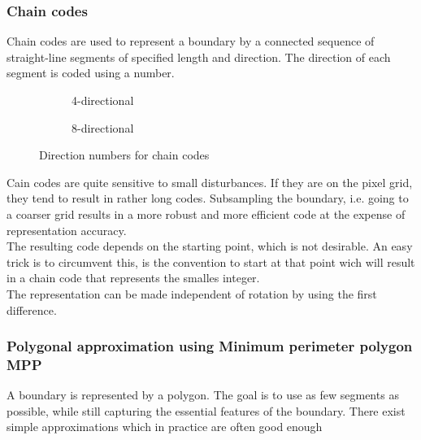 \subsubsection{Chain codes}
Chain codes are used to represent a boundary by a connected sequence of straight-line segments of specified length and direction. The direction of each segment is coded using a number.
\begin{figure}[h]
	\centering
	\begin{subfigure}[b]{0.45\textwidth}
		\centering
		\caption{4-directional}
	\end{subfigure}
	\begin{subfigure}[b]{0.45\textwidth}
		\centering
		\caption{8-directional}
	\end{subfigure}
	\caption{Direction numbers for chain codes}
\end{figure}

Cain codes are quite sensitive to small disturbances. If they are on the pixel grid, they tend to result in rather long codes. Subsampling the boundary, i.e. going to a coarser grid results in a more robust and more efficient code at the expense of representation accuracy.\\
The resulting code depends on the starting point, which is not desirable. An easy trick is to circumvent this, is the convention to start at that point wich will result in a chain code that represents the smalles integer.\\
The representation can be made independent of rotation by using the first difference.
\subsubsection{Polygonal approximation using Minimum perimeter polygon MPP}
A boundary is represented by a polygon. The goal is to use as few segments as possible, while still capturing the essential features of the boundary. There exist simple approximations which in practice are often good enough\\

